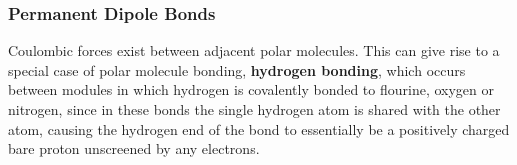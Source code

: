 \documentclass{article}
\begin{document}
\subsubsection{Permanent Dipole Bonds}

Coulombic forces exist between adjacent polar molecules. This can give rise to a special case of polar molecule bonding, \textbf{hydrogen bonding}, which occurs between modules in which hydrogen is covalently bonded to flourine, oxygen or nitrogen, since in these bonds the single hydrogen atom is shared with the other atom, causing the hydrogen end of the bond to essentially be a positively charged bare proton unscreened by any electrons.
\end{document}
